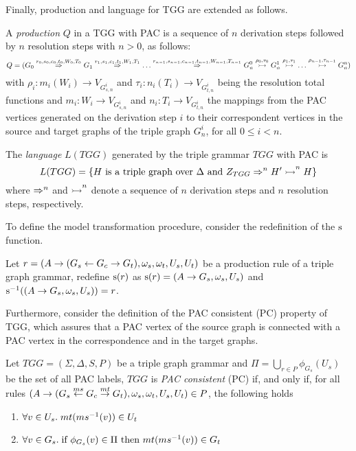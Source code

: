 Finally, production and language for TGG are extended as follows.

\begin{definition}
	A \emph{production} $Q$ in a TGG with PAC is a sequence of $n$ derivation steps followed by $n$ resolution steps with $n > 0$, as follows:
	\begin{equation*}
		Q = (G_0 \derivpac{r_0}{s_0,c_0,t_0}{W_0,T_0}{} G_1 \derivpac{r_1}{s_1,c_1,t_1}{W_1,T_1}{} \dots \derivpac{r_{n-1}}{s_{n-1},c_{n-1},t_{n-1}}{W_{n-1},T_{n-1}}{} G_n^0 \resolv{\rho_0,\tau_0} G_n^1 \resolv{\rho_1,\tau_1} \dots \resolv{\rho_{n-1},\tau_{n-1}} G_n^n)
	\end{equation*}
	with $\rho_i: m_i(W_i) \to V_{G_{s,n}^i}$ and $\tau_i: n_i(T_i) \to V_{G_{t,n}^i}$ being the resolution total functions and $m_i : W_i \to V_{G_{s,n}^i}$ and $n_i : T_i \to V_{G_{t,n}^i}$ the mappings from the PAC vertices generated on the derivation step $i$ to their correspondent vertices in the source and target graphs of the triple graph $G_n^i$, for all $0 \le i < n$.
\end{definition}

\begin{definition}
	The \emph{language} $L(TGG)$ generated by the triple grammar $TGG$ with PAC is
	\begin{equation*}
		L(TGG) = \{ H \text{ is a triple graph over } \Delta \text{ and } \startTG{TGG} \tderivpacn{}{n} H' \tresolvn{}{n} H \}
	\end{equation*}
	where $\tderivpacn{}{n}$ and $\tresolvn{}{n}$ denote a sequence of $n$ derivation steps and $n$ resolution steps, respectively.
\end{definition}

To define the model transformation procedure, consider the redefinition of the $\source$ function.

\begin{definition}
	\label{def:sourcepac}
	Let $r = (A \pro (G_s \ms{} G_c \mt{} G_t), \omega_s, \omega_t, U_s, U_t)$ be a production rule of a triple graph grammar, redefine $\source(r)$ as $\source(r) = (A \pro G_s,\omega_s,U_s)$ and $\source^{-1}((A \pro G_s,\omega_s,U_s)) = r$.
\end{definition}

Furthermore, consider the definition of the PAC consistent (PC) property of TGG, which assures that a PAC vertex of the source graph is connected with a PAC vertex in the correspondence and in the target graphs.

\begin{definition}
	Let $TGG = (\Sigma, \Delta, S, P)$ be a triple graph grammar and $\Pi = \bigcup_{r \in P}{\phi_{G_s}(U_s)}$ be the set of all PAC labels, $TGG$ is \emph{PAC consistent} (PC) if, and only if, for all rules $(A \pro (G_s \ms{ms} G_c \mt{mt} G_t), \omega_s, \omega_t, U_s, U_t) \in P$, the following holds
	\begin{enumerate}
		\item $\forall v \in U_s \. mt(ms^{-1}(v)) \in U_t$
		\item $\forall v \in G_s \. \text{if } \phi_{G_s}(v) \in \Pi \text{ then } mt(ms^{-1}(v)) \in G_t$
	\end{enumerate}
\end{definition}

